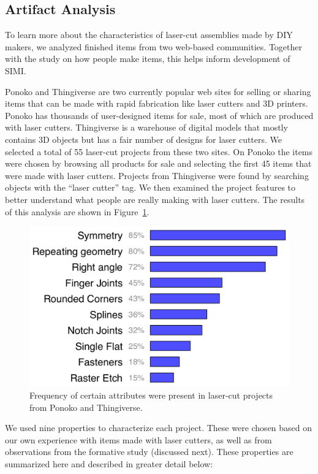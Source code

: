 \documentclass{article}
\begin{document}
\subsection{Artifact Analysis}

To learn more about the characteristics of laser-cut assemblies made
by DIY makers, we analyzed finished items from two web-based
communities. Together with the study on how people make items, this
helps inform development of SIMI.

Ponoko and Thingiverse are two currently popular web sites for selling
or sharing items that can be made with rapid fabrication like laser
cutters and 3D printers. Ponoko has thousands of user-designed items
for sale, most of which are produced with laser cutters. Thingiverse
is a warehouse of digital models that mostly contains 3D objects but
has a fair number of designs for laser cutters. We selected a total of
55 laser-cut projects from these two sites. On Ponoko the items were
chosen by browsing all products for sale and selecting the first 45
items that were made with laser cutters. Projects from Thingiverse
were found by searching objects with the ``laser cutter'' tag. We then
examined the project features to better understand what people are
really making with laser cutters. The results of this analysis are
shown in Figure~\ref{fig:ponoko}.

\begin{figure}[h]
  \centering
  \includegraphics[width=0.9\linewidth]{img/ponoko-graph.pdf}
  \caption{Frequency of certain attributes were present in laser-cut
    projects from Ponoko and Thingiverse.}
  \label{fig:ponoko}
\end{figure}

We used nine properties to characterize each project. These were
chosen based on our own experience with items made with laser cutters,
as well as from observations from the formative study (discussed
next). These properties are summarized here and described in greater
detail below:
\end{document}

